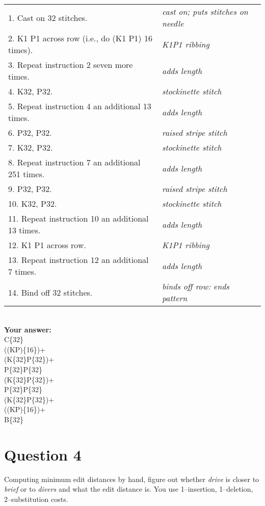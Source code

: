 \documentclass[a4paper]{article}
\begin{document}
\begin{tabular}{l>{\itshape}l}
1. Cast on 32 stitches. &cast on; puts stitches on needle\\
2. K1 P1 across row (i.e., do (K1 P1) 16 times). &K1P1 ribbing\\
3. Repeat instruction 2 seven more times. &adds length\\
4. K32, P32. &stockinette stitch\\
5. Repeat instruction 4 an additional 13 times. &adds length\\
6. P32, P32. &raised stripe stitch\\
7. K32, P32. &stockinette stitch\\
8. Repeat instruction 7 an additional 251 times. &adds length\\
9. P32, P32. &raised stripe stitch\\
10. K32, P32. &stockinette stitch\\
11. Repeat instruction 10 an additional 13 times. &adds length\\
12. K1 P1 across row. &K1P1 ribbing\\
13. Repeat instruction 12 an additional 7 times. &adds length\\
14. Bind off 32 stitches. &binds off row: ends pattern\\
\end{tabular}\\

\textbf{Your answer:\\}
C\{32\}\\
((KP)\{16\})+\\
(K\{32\}P\{32\})+\\
P\{32\}P\{32\}\\
(K\{32\}P\{32\})+\\
P\{32\}P\{32\}\\
(K\{32\}P\{32\})+\\
((KP)\{16\})+\\
B\{32\}\\

\section{Question 4}
Computing minimum edit distances by hand, figure out whether \textit{drive} is closer to \textit{brief} or to \textit{divers} and what the edit distance is.
You use 1--insertion, 1--deletion, 2--substitution costs.\\
\end{document}

